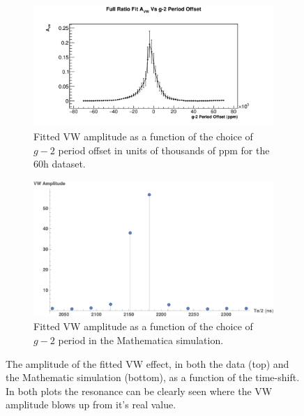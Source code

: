 \documentclass[12pt,letterpaper]{article}
\def\gmtwo{$g-2$\xspace}
\begin{document}
\begin{figure}[]
\centering
    \begin{subfigure}[t]{0.8\textwidth}
        \centering
        \includegraphics[width=\textwidth]{AvwResonance_60h}
        \caption{Fitted VW amplitude as a function of the choice of \gmtwo period offset in units of thousands of ppm for the 60h dataset.}
    \end{subfigure}%
    \vspace{1cm}
    \begin{subfigure}[t]{0.6\textwidth}
        \centering
        \includegraphics[width=\textwidth]{AvwResonance_Mathematica}
        \caption{Fitted VW amplitude as a function of the choice of \gmtwo period in the Mathematica simulation.}
    \end{subfigure}
\caption[]{The amplitude of the fitted VW effect, in both the data (top) and the Mathematic simulation (bottom), as a function of the time-shift. In both plots the resonance can be clearly seen where the VW amplitude blows up from it's real value.}
\label{fig:resonance}
\end{figure}

\end{document}
